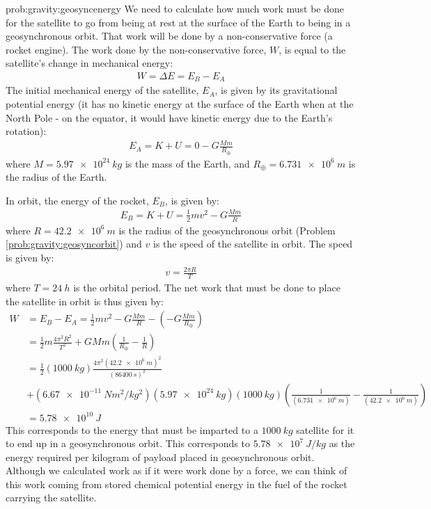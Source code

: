 \begin{solution}{prob:gravity:geosyncenergy}\label{soln:gravity:geosyncenergy}
We need to calculate how much work must be done for the satellite to go from being at rest at the surface of the Earth to being in a geosynchronous orbit. That work will be done by a non-conservative force (a rocket engine). The work done by the non-conservative force, $W$, is equal to the satellite's change in mechanical energy:
\begin{align*}
W = \Delta E = E_B -E_A
\end{align*}
The initial mechanical energy of the satellite, $E_A$, is given by its gravitational potential energy (it has no kinetic energy at the surface of the Earth when at the North Pole - on the equator, it would have kinetic energy due to the Earth's rotation):
\begin{align*}
E_A = K + U = 0 - G\frac{Mm}{R_\oplus}
\end{align*}
where $M=\SI{5.97e24}{kg}$ is the mass of the Earth, and $R_\oplus=\SI{6.731e6}{m}$ is the radius of the Earth.  

In orbit, the energy of the rocket, $E_B$, is given by:
\begin{align*}
E_B = K + U = \frac{1}{2}mv^2 - G\frac{Mm}{R}
\end{align*}
where $R=\SI{42.2e6}{m}$ is the radius of the geosynchronous orbit (Problem \ref{prob:gravity:geosyncorbit}) and $v$ is the speed of the satellite in orbit. The speed is given by:
\begin{align*}
v = \frac{2\pi R}{T}
\end{align*}
where $T=\SI{24}{h}$ is the orbital period. The net work that must be done to place the satellite in orbit is thus given by:
\begin{align*}
W &= E_B - E_A = \frac{1}{2}mv^2 - G\frac{Mm}{R} - \left(- G\frac{Mm}{R_\oplus}\right)\\
&=\frac{1}{2}m\frac{4\pi^2 R^2}{T^2}+GMm\left(\frac{1}{R_\oplus}-\frac{1}{R}\right)\\
&=\frac{1}{2}(\SI{1000}{kg})\frac{4\pi^2 (\SI{42.2e6}{m})^2}{(\SI{86400}{s})^2}\\
&+(\SI{6.67e-11}{Nm^2/kg^2})(\SI{5.97e24}{kg})(\SI{1000}{kg})\left(\frac{1}{(\SI{6.731e6}{m})}-\frac{1}{(\SI{42.2e6}{m})}\right)\\
&=\SI{5.78e10}{J}
\end{align*}
This corresponds to the energy that must be imparted to a $\SI{1000}{kg}$ satellite for it to end up in a geosynchronous orbit. This corresponds to $\SI{5.78e7}{J/kg}$ as the energy required per kilogram of payload placed in geosynchronous orbit. Although we calculated work as if it were work done by a force, we can think of this work coming from stored chemical potential energy in the fuel of the rocket carrying the satellite. 


\end{solution}
